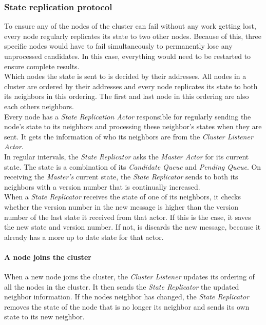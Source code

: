 \subsubsection{State replication protocol}\label{protocol:stateReplication}
To ensure any of the nodes of the cluster can fail without any work getting lost, every node regularly replicates its state to two other nodes.
Because of this, three specific nodes would have to fail simultaneously to permanently lose any unprocessed candidates. 
In this case, everything would need to be restarted to ensure complete results. \\
Which nodes the state is sent to is decided by their addresses.
All nodes in a cluster are ordered by their addresses and every node replicates its state to both its neighbors in this ordering.
The first and last node in this ordering are also each others neighbors.\\
Every node has a \emph{State Replication Actor} responsible for regularly sending the node's state to its neighbors and processing these neighbor's states when they are sent.
It gets the information of who its neighbors are from the \emph{Cluster Listener Actor}. \\
In regular intervals, the \emph{State Replicator} asks the \emph{Master Actor} for its current state.
The state is a combination of its \emph{Candidate Queue} and \emph{Pending Queue}.
On receiving the \emph{Master's} current state, the \emph{State Replicator} sends to both its neighbors with a version number that is continually increased.\\
When a \emph{State Replicator} receives the state of one of its neighbors, it checks whether the version number in the new message is higher than the version number of the last state it received from that actor.
If this is the case, it saves the new state and version number.
If not, is discards the new message, because it already has a more up to date state for that actor.

\paragraph{A node joins the cluster}
When a new node joins the cluster, the \emph{Cluster Listener} updates its ordering of all the nodes in the cluster. 
It then sends the \emph{State Replicator} the updated neighbor information.
If the nodes neighbor has changed, the \emph{State Replicator} removes the state of the node that is no longer its neighbor and sends its own state to its new neighbor.

